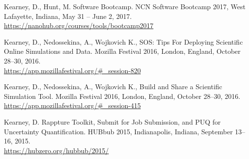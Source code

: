 \documentclass[10pt]{article}
\renewcommand\emph[1]{#1}
\begin{document}
\begin{bibenum}

    \item Kearney, D., Hunt, M. Software Bootcamp. \emph{NCN Software Bootcamp 2017},
        West Lafayette, Indiana, May 31 -- June 2, 2017.
        \url{https://nanohub.org/courses/tools/bootcamp2017}

    \item Kearney, D., Nedossekina, A., Wojkovich K., SOS: Tips
        For Deploying Scientific Online Simulations and Data.
        \emph{Mozilla Festival 2016},
        London, England, October 28--30, 2016. \\
        \url{https://app.mozillafestival.org/#_session-820}

    \item Kearney, D., Nedossekina, A., Wojkovich K., Build and Share
        a Scientific Simulation Tool. \emph{Mozilla Festival 2016},
        London, England, October 28--30, 2016. \\
        \url{https://app.mozillafestival.org/#_session-415}

    \item Kearney, D. Rappture Toolkit, Submit for Job Submission, and
        PUQ for Uncertainty Quantification. \emph{HUBbub 2015},
        Indianapolis, Indiana, September 13--16, 2015. \\
        \url{https://hubzero.org/hubbub/2015/}


\end{bibenum}
\end{document}
